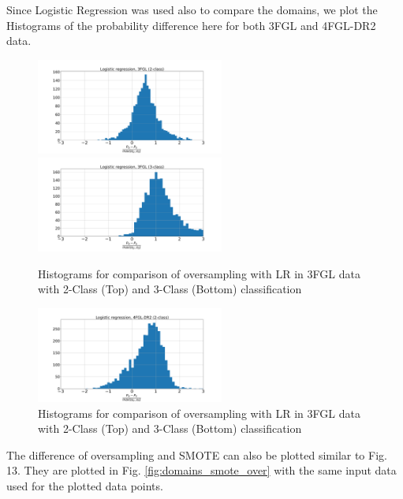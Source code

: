 Since Logistic Regression was used also to compare the domains, we plot the Histograms of the probability difference here for both 3FGL and 4FGL-DR2 data.
\begin{figure}[h]
\centering
\hspace*{-0.5cm}
\includegraphics[width=0.55\textwidth]{plots/hist_diff_smote_LR_3FGL_2class.pdf}
\hspace*{-0.5cm}
\includegraphics[width=0.55\textwidth]{plots/hist_diff_smote_LR_3FGL_3class.pdf}
\caption{Histograms for comparison of oversampling with LR in 3FGL data with 2-Class (Top) and 3-Class (Bottom) classification
}
\label{fig:nn_nn}
\end{figure}

\begin{figure}[h]
\centering
\hspace*{-0.5cm}
\includegraphics[width=0.55\textwidth]{plots/hist_diff_smote_LR_4FGL-DR2_2class.pdf}
\caption{Histograms for comparison of oversampling with LR in 3FGL data with 2-Class (Top) and 3-Class (Bottom) classification
}
\label{fig:nn_nn}
\end{figure}

The difference of oversampling and SMOTE can also be plotted similar to Fig. 13. They are plotted in Fig. \ref{fig:domains_smote_over} with the same input data used for the plotted data points.


